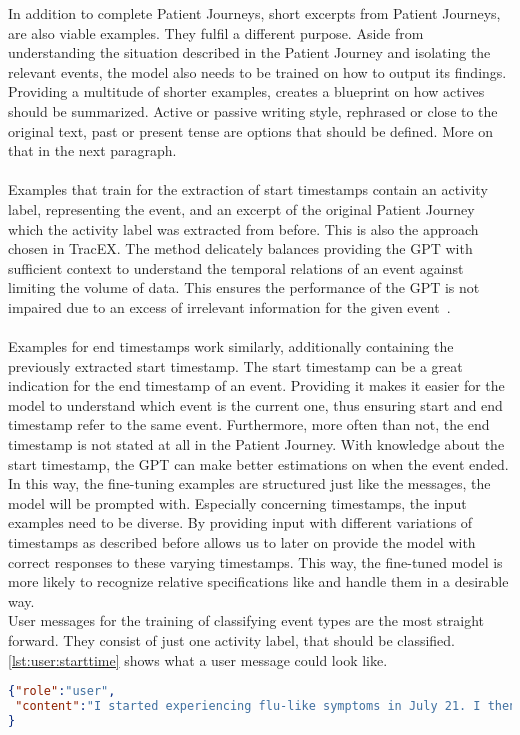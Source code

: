 In addition to complete Patient Journeys, short excerpts from Patient Journeys, are also viable examples. They fulfil a different purpose. Aside from understanding the situation described in the Patient Journey and isolating the relevant events, the model also needs to be trained on how to output its findings. Providing a multitude of shorter examples, creates a blueprint on how actives should be summarized. Active or passive writing style, rephrased or close to the original text, past or present tense are options that should be defined. More on that in the next paragraph.\\\\
Examples that train for the extraction of start timestamps contain an activity label, representing the event, and an excerpt of the original Patient Journey which the activity label was extracted from before. This is also the approach chosen in TracEX. The method delicately balances providing the GPT with sufficient context to understand the temporal relations of an event against limiting the volume of data. This ensures the performance of the GPT is not impaired due to an excess of irrelevant information for the given event~\cite{han_is_2023}.\\\\
Examples for end timestamps work similarly, additionally containing the previously extracted start timestamp. The start timestamp can be a great indication for the end timestamp of an event. Providing it makes it easier for the model to understand which event is the current one, thus ensuring start and end timestamp refer to the same event. Furthermore, more often than not, the end timestamp is not stated at all in the Patient Journey. With knowledge about the start timestamp, the GPT can make better estimations on when the event ended.\\
In this way, the fine-tuning examples are structured just like the messages, the model will be prompted with. Especially concerning timestamps, the input examples need to be diverse. By providing input with different variations of timestamps as described before allows us to later on provide the model with  correct responses to these varying timestamps. This way, the fine-tuned model is more likely to recognize relative specifications like  and handle them in a desirable way. \\
User messages for the training of classifying event types are the most straight forward. They consist of just one activity label, that should be classified.\\
\autoref{lst:user:starttime} shows what a user message could look like.
\begin{lstlisting}[language=json, caption={User message for determining an activities start timestamp}, label={lst:user:starttime}]
{"role":"user",
 "content":"I started experiencing flu-like symptoms in July 21. I then got tested positive for Covid19. In October I got infected again. Then on the 4th of November I got my first dosage of the vaccine. I had heavy side effects.\n Activity Label: starting to experience symptoms"
}
\end{lstlisting}

